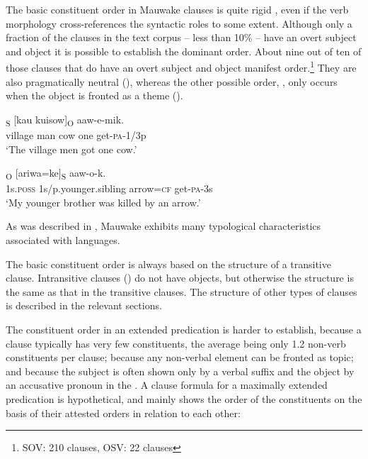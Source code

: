 The basic constituent order in Mauwake clauses is quite rigid , even if the verb morphology cross-references the syntactic roles to some extent. Although only a fraction of the clauses in the text corpus -- less than 10\% -- have an overt subject and object  it is possible to establish the dominant order. About nine out of ten of those clauses that do have an overt subject and object  manifest  order.\footnote{SOV: 210 clauses, OSV: 22 clauses} They are also pragmatically neutral (), whereas the other possible order, , only occurs when the object is fronted as a theme (). 

\ea%
\label{ex:x896}
\textsubscript{S}  [kau  kuisow]\textsubscript{O}  aaw-e-mik. \\
     village  man  cow  one  get-\textsc{pa}-1/3p \\
\glt `The village men got one cow.'
\z
 

\ea%
\label{ex:x897}
\textsubscript{O}  [ariwa=ke]\textsubscript{S}  aaw-o-k. \\
      1s.\textsc{poss}  1s/p.younger.sibling  arrow=\textsc{cf}  get-\textsc{pa}-3s \\
\glt `My younger brother was killed by an arrow.'
\z

As was described in , Mauwake exhibits many typological characteristics associated with  languages.

The basic constituent order is always based on the structure of a transitive clause. Intransitive clauses () do not have objects, but otherwise the structure is the same as that in the transitive clauses. The structure of other types of clauses is described in the relevant sections.

The constituent order in an extended predication is harder to establish, because a clause typically has very few constituents, the average being only 1.2 non-verb constituents per clause; because any non-verbal element can be fronted as topic; and because the subject is often shown only by a verbal suffix and the object by an accusative pronoun in the . A clause formula for a maximally extended predication is hypothetical, and mainly shows the order of the constituents on the basis of their attested orders in relation to each other: 

